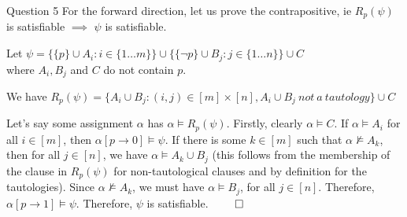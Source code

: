 \documentclass{beamer}
\begin{document}
{\begin{frame}{Question 5}
            For the forward direction, let us prove the contrapositive, ie $R_{p}(\psi)$ is satisfiable $\implies$ $\psi$ is satisfiable. 

            Let $\psi = \{\{p\} \cup A_{i}: i \in \{1 \dots m\}\} \cup \{\{\neg p\} \cup B_{j}: j \in \{1 \dots n\}\} \cup C$\\where $A_{i}, B_{j}$ and $C$ do not contain $p$.

            We have $R_{p}(\psi) = \{A_{i} \cup B_{j}: (i, j) \in [m] \times [n], A_{i} \cup B_{j}\ not\ a\ tautology\} \cup C$

            Let's say some assignment $\alpha$ has $\alpha \vDash R_{p}(\psi)$. Firstly, clearly $\alpha \vDash C$. If $\alpha \vDash A_{i}$ for all $i \in [m]$, then $\alpha[p \rightarrow 0] \vDash \psi$. If there is some $k \in [m]$ such that $\alpha \nvDash A_{k}$, then for all $j \in [n]$, we have $\alpha \vDash A_{k} \cup B_{j}$ (this follows from the membership of the clause in $R_{p}(\psi)$ for non-tautological clauses and by definition for the tautologies). Since $\alpha \nvDash A_{k}$, we must have $\alpha \vDash B_{j}$, for all $j \in [n]$. Therefore, $\alpha[p \rightarrow 1] \vDash \psi$. Therefore, $\psi$ is satisfiable. $\qed$





        \end{frame}
    }
\end{document}
